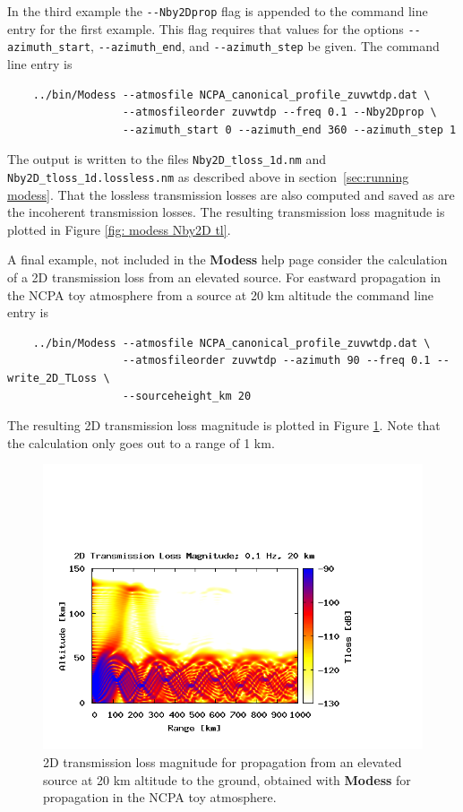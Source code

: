 In the third example the \verb+--Nby2Dprop+ flag is appended to the command line entry for the first example. This flag requires that values for the options \verb+--azimuth_start+, \verb+--azimuth_end+, and \verb+--azimuth_step+ be given. The command line entry is 
\begin{verbatim} 
    ../bin/Modess --atmosfile NCPA_canonical_profile_zuvwtdp.dat \
                  --atmosfileorder zuvwtdp --freq 0.1 --Nby2Dprop \
                  --azimuth_start 0 --azimuth_end 360 --azimuth_step 1
\end{verbatim}
The output is written to the files \verb+Nby2D_tloss_1d.nm+ and \verb+Nby2D_tloss_1d.lossless.nm+ as described above in section~\ref{sec:running modess}. That the lossless transmission losses are also computed and saved as are the incoherent transmission losses. The resulting transmission loss magnitude is plotted in Figure \ref{fig: modess Nby2D tl}. 

A final example, not included in the \textbf{Modess} help page consider the calculation of a 2D transmission loss from an elevated source. For eastward propagation in the NCPA toy atmosphere from a source at 20 km altitude the command line entry is 
\begin{verbatim} 
    ../bin/Modess --atmosfile NCPA_canonical_profile_zuvwtdp.dat \ 
                  --atmosfileorder zuvwtdp --azimuth 90 --freq 0.1 --write_2D_TLoss \
                  --sourceheight_km 20
\end{verbatim}
The resulting 2D transmission loss magnitude is plotted in Figure \ref{fig: modess 2D elevated source}. Note that the calculation only goes out to a range of 1 km. 

\begin{figure}
\begin{center}
\includegraphics[scale=0.45,trim = 20 20 110 140,clip]{figs/modess_ex2_20km_source}
\end{center}
\caption{2D transmission loss magnitude for propagation from an elevated source at 20 km altitude to the ground, obtained with {\bf Modess} for propagation in the NCPA toy atmosphere.}
\label{fig: modess 2D elevated source}
\end{figure}

